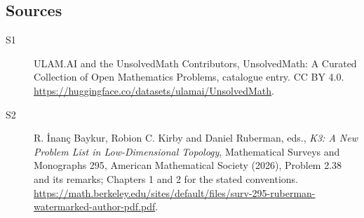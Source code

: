 \documentclass[11pt]{article}
\begin{document}
\subsection{Sources}
\begin{description}
\item[\hypertarget{source:statement:1}{S1}] ULAM.AI and the UnsolvedMath Contributors, UnsolvedMath: A Curated Collection of Open Mathematics Problems, catalogue entry. CC BY 4.0. \url{https://huggingface.co/datasets/ulamai/UnsolvedMath}.
\item[\hypertarget{source:statement:2}{S2}] R. İnanç Baykur, Robion C. Kirby and Daniel Ruberman, eds., \emph{K3: A New Problem List in Low-Dimensional Topology}, Mathematical Surveys and Monographs 295, American Mathematical Society (2026), Problem 2.38 and its remarks; Chapters 1 and 2 for the stated conventions. \url{https://math.berkeley.edu/sites/default/files/surv-295-ruberman-watermarked-author-pdf.pdf}.
\end{description}
\label{end:statement}
\end{document}
